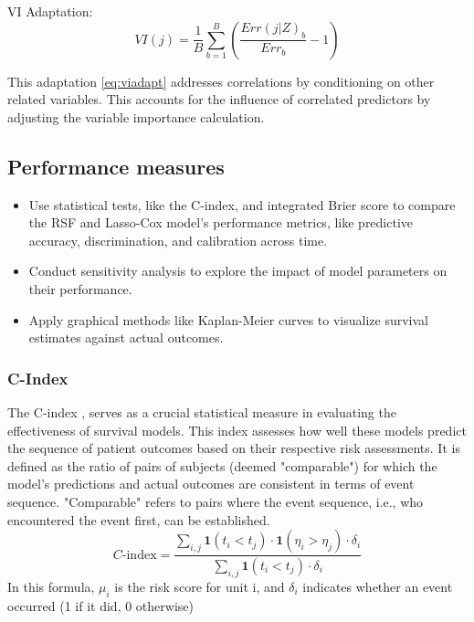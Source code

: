 \noindent VI Adaptation:
\begin{equation} \label{eq:viadapt}VI(j) = \frac{1}{B}\sum_{b=1}^{B}(\frac{Err(j|Z)_{b}}{Err_{b}}-1)\end{equation}

\noindent This adaptation \ref{eq:viadapt} addresses correlations \parencite{pham_springer_2023} by conditioning on other related variables. This accounts for the influence of correlated predictors by adjusting the variable importance calculation.


\subsection{Performance measures}
\begin{itemize}
\item Use statistical tests, like the C-index, and integrated Brier score to compare the RSF and Lasso-Cox model's performance metrics, like predictive accuracy, discrimination, and calibration across time.
\item Conduct sensitivity analysis to explore the impact of model parameters on their performance.
\item Apply graphical methods like Kaplan-Meier curves to visualize survival estimates against actual outcomes.
\end{itemize}

\subsubsection{C-Index}
\noindent The C-index \parencite{qi_effective_2023}, serves as a crucial statistical measure in evaluating the effectiveness of survival models. This index assesses how well these models predict the sequence of patient outcomes based on their respective risk assessments. It is defined as the ratio of pairs of subjects (deemed "comparable") for which the model's predictions and actual outcomes are consistent in terms of event sequence. "Comparable" refers to pairs where the event sequence, i.e., who encountered the event first, can be established.
\begin{equation} \label{eq:cindex}C\text{-index} = \frac{\sum_{i,j} \mathbf{1}(t_i < t_j) \cdot \mathbf{1}(\eta_i > \eta_j) \cdot \delta_i}{\sum_{i,j} \mathbf{1}(t_i < t_j) \cdot \delta_i}\end{equation}
\noindent In this formula, \(\mu_{i}\) is the risk score for unit i, and \(\delta_{i}\) indicates whether an event occurred (1 if it did, 0 otherwise)
